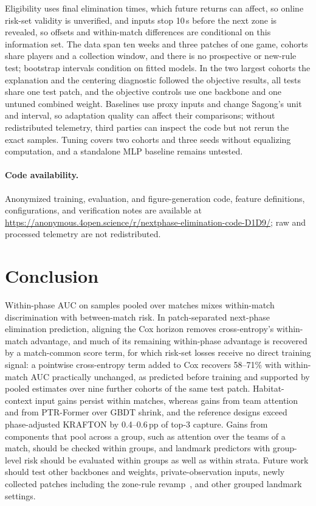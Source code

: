 \documentclass[sigconf,anonymous,nonacm]{acmart}
\newcommand{\artifacturl}{\url{https://anonymous.4open.science/r/nextphase-elimination-code-D1D9/}}
\begin{document}
Eligibility uses final elimination times, which future returns can affect, so online risk-set validity is unverified, and inputs stop 10\,s before the next zone is revealed, so offsets and within-match differences are conditional on this information set. The data span ten weeks and three patches of one game, cohorts share players and a collection window, and there is no prospective or new-rule test; bootstrap intervals condition on fitted models. In the two largest cohorts the explanation and the centering diagnostic followed the objective results, all tests share one test patch, and the objective controls use one backbone and one untuned combined weight. Baselines use proxy inputs and change Sagong's unit and interval, so adaptation quality can affect their comparisons; without redistributed telemetry, third parties can inspect the code but not rerun the exact samples. Tuning covers two cohorts and three seeds without equalizing computation, and a standalone MLP baseline remains untested.

\paragraph{Code availability.}
Anonymized training, evaluation, and figure-generation code, feature definitions, configurations, and verification notes are available at \artifacturl{}; raw and processed telemetry are not redistributed.

\section{Conclusion}
\label{sec:conclusion}
Within-phase AUC on samples pooled over matches mixes within-match discrimination with between-match risk. In patch-separated next-phase elimination prediction, aligning the Cox horizon removes cross-entropy's within-match advantage, and much of its remaining within-phase advantage is recovered by a match-common score term, for which risk-set losses receive no direct training signal: a pointwise cross-entropy term added to Cox recovers 58--71\% with within-match AUC practically unchanged, as predicted before training and supported by pooled estimates over nine further cohorts of the same test patch. Habitat-context input gains persist within matches, whereas gains from team attention and from PTR-Former over GBDT shrink, and the reference designs exceed phase-adjusted KRAFTON by 0.4--0.6\,pp of top-3 capture. Gains from components that pool across a group, such as attention over the teams of a match, should be checked within groups, and landmark predictors with group-level risk should be evaluated within groups as well as within strata. Future work should test other backbones and weights, private-observation inputs, newly collected patches including the zone-rule revamp~\cite{PUBGBlueZone2026}, and other grouped landmark settings.
\end{document}
